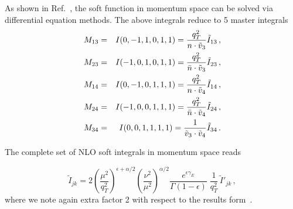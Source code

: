 \documentclass[a4paper,11pt]{report}
\numberwithin{equation}{section}
\begin{document}
As shown in Ref.~\cite{AntoniaMTh}, the soft function in momentum space can be
solved via differential equation methods. The above integrals reduce to 5 master
integrals
%
\begin{eqnarray}
  M_{13} & = & I(0,-1,1,0,1,1) =
               \frac{q_T^2}{n\cdot \tilde v_3}\tilde I_{13}\,,
  \nonumber \\
  M_{23} & = & I(-1,0,1,0,1,1) =
               \frac{q_T^2}{\bar{n}\cdot \tilde v_3}\tilde I_{23}\,,
  \nonumber \\
  M_{14} & = & I(0,-1,0,1,1,1) =
               \frac{q_T^2}{n\cdot \tilde v_4}\tilde I_{14}\,,
  \label{eq:MIs-NLO}
  \\
  M_{24} & = & I(-1,0,0,1,1,1) =
               \frac{q_T^2}{\bar{n}\cdot \tilde v_4}\tilde I_{24}\,,
  \nonumber \\
  M_{34} & = & I(0,0,1,1,1,1)=
               \frac{1}{\tilde v_3 \cdot \tilde v_4}\tilde I_{34}\,.
  \nonumber
\end{eqnarray}

The complete set of NLO soft integrals in momentum space reads~\cite{AntoniaMTh}

\begin{equation}
  \tilde I_{jk} = 2
  \left(\frac{\mu^2}{q_T^2}\right)^{\epsilon+\alpha/2}
  \left(\frac{\nu^2}{\mu^2}\right)^{\alpha/2}\!\! \!
  \frac{e^{\epsilon\gamma_E}}{\Gamma(1-\epsilon)}\;
  \frac{1}{q_T^2}\,
  \tilde I'_{jk}\,,
  \label{eq:NLO-soft-function-mom-fac}
\end{equation}
where we note again extra factor 2 with respect to the results
form~\cite{Li:2013mia}.
 
\end{document}
